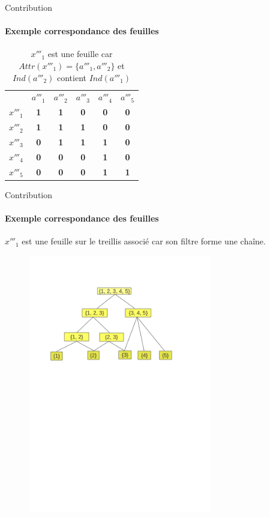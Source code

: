 \documentclass{beamer}
\begin{document}
  \begin{frame}{Contribution}
  \framesubtitle{Exemple correspondance des feuilles}
	\begin{table}[htb]
	  \centering

	\begin{tabular}{lccccc}
	& $a'''_1$ & $a'''_2$ & $a'''_3$ & $a'''_4$ & $a'''_5$\\
	$x'''_1$ & \textbf{1} & \textbf{1} & \textbf{0} & \textbf{0} & \textbf{0}\\
	$x'''_2$ & \textbf{1} & \textbf{1} & \textbf{1} & \textbf{0} & \textbf{0}\\
	$x'''_3$ & \textbf{0} & \textbf{1} & \textbf{1} & \textbf{1} & \textbf{0}\\
	$x'''_4$ & \textbf{0} & \textbf{0} & \textbf{0} & \textbf{1} & \textbf{0}\\
	$x'''_5$ & \textbf{0} & \textbf{0} & \textbf{0} & \textbf{1} & \textbf{1}
	\end{tabular}
   \caption{$x'''_1$ est une feuille car $Attr(x'''_1) =\{a'''_1, a'''_2\}$ et  $Ind(a'''_2)$ contient $Ind(a'''_1)$}
	\end{table}
  \end{frame}

  \begin{frame}{Contribution}
  \framesubtitle{Exemple correspondance des feuilles}
   $x'''_1$ est une feuille sur le treillis associé car son filtre forme une chaîne.
   \begin{figure}
	\includegraphics[width=8cm]{images/treillismoins2.png} 
    
    \end{figure}
   
  \end{frame}
\end{document}
